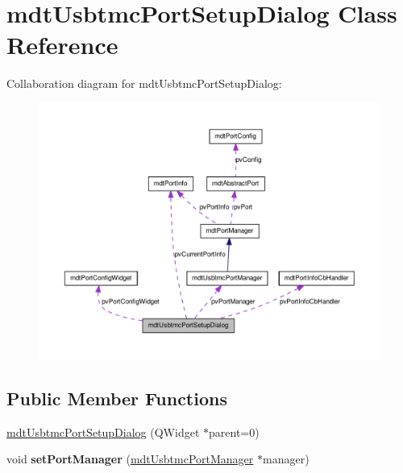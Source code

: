 \hypertarget{classmdt_usbtmc_port_setup_dialog}{
\section{mdtUsbtmcPortSetupDialog Class Reference}
\label{classmdt_usbtmc_port_setup_dialog}
}


Collaboration diagram for mdtUsbtmcPortSetupDialog:\nopagebreak
\begin{figure}[H]
\begin{center}
\leavevmode
\includegraphics[width=400pt]{classmdt_usbtmc_port_setup_dialog__coll__graph}
\end{center}
\end{figure}
\subsection*{Public Member Functions}
\begin{DoxyCompactItemize}
\item 
\hyperlink{classmdt_usbtmc_port_setup_dialog_afdfb9303c8c2a1c9da8ecb19d5c19610}{mdtUsbtmcPortSetupDialog} (QWidget $\ast$parent=0)
\item 
\hypertarget{classmdt_usbtmc_port_setup_dialog_a6ba6d427e46bfcdd32c5ac740040de4e}{
void {\bfseries setPortManager} (\hyperlink{classmdt_usbtmc_port_manager}{mdtUsbtmcPortManager} $\ast$manager)}
\label{classmdt_usbtmc_port_setup_dialog_a6ba6d427e46bfcdd32c5ac740040de4e}

\end{DoxyCompactItemize}


